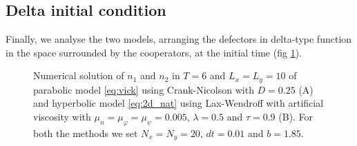 \subsection{Delta initial condition}

Finally, we analyse the two models, arranging the defectors in delta-type
function in the space surrounded by the cooperators, at the initial
time (fig \ref{fig:delta}). 

\begin{figure}

\caption{\label{fig:delta}Numerical solution of $n_{1}$ and $n_{2}$ in $T=6$
and $L_{x}=L_{y}=10$ of parabolic model \ref{eq:vick} using Crank-Nicolson
with $D=0.25$ (A) and hyperbolic model \ref{eq:2d_nat} using Lax-Wendroff
with artificial viscosity with $\mu_{n}=\mu_{\varphi}=\mu_{\psi}=0.005$,
$\lambda=0.5$ and $\tau=0.9$ (B). For both the methods we set $N_{x}=N_{y}=20$,
$dt=0.01$ and $b=1.85$.}
\end{figure}


